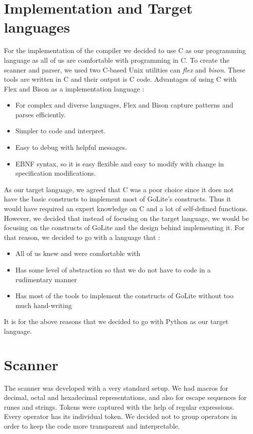 \documentclass[a4paper]{article}
\begin{document}
\section{Implementation and Target languages}
For the implementation of the compiler we decided to use C as our programming language as all of us are comfortable with programming in C. To create the scanner and parser, we used two C-based Unix utilities can \textit{flex} and \textit{bison}. These tools are written in C and their output is C code. 
\newline \newline
Advantages of using C with Flex and Bison as a implementation language :
\begin{itemize}
	\item For complex and diverse languages, Flex and Bison capture patterns and parses efficiently.
    \item Simpler to code and interpret. 
    \item Easy to debug with helpful messages.
    \item EBNF syntax, so it is easy flexible and easy to modify with change in specification modifications.
\end{itemize}

As our target language, we agreed that C was a poor choice since it does not have the basic constructs to implement most of GoLite's constructs. Thus it would have required an expert knowledge on C and a lot of self-defined functions. However, we decided that instead of focusing on the target language, we would be focusing on the constructs of GoLite and the design behind implementing it. For that reason, we decided to go with a language that : 
\begin{itemize}
	\item All of us knew and were comfortable with
    \item Has some level of abstraction so that we do not have to code in a rudimentary manner
    \item Has most of the tools to implement the constructs of GoLite without too much hand-writing
\end{itemize}
It is for the above reasons that we decided to go with Python as our target language. 


\section{Scanner}

The scanner was developed with a very standard setup. We had macros for decimal, octal and hexadecimal representations, and also for escape sequences for runes and strings. Tokens were captured with the help of regular expressions. Every operator has its individual token. We decided not to group operators in order to keep the code more transparent and interpretable.
\end{document}

